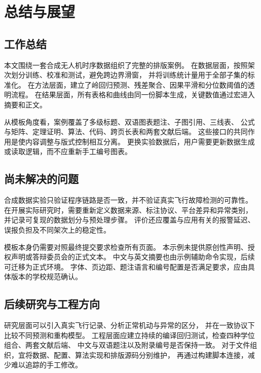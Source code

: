 \chapter{总结与展望}\label{chap:conclusions}
\section{工作总结}
本文围绕一套合成无人机时序数据组织了完整的排版案例。
在数据层面，按照架次划分训练、校准和测试，避免跨边界滑窗，
并将训练统计量用于全部子集的标准化。
在方法层面，建立了岭回归预测、残差聚合、因果平滑和分位数阈值的透明流程。
在结果层面，所有表格和曲线由同一份脚本生成，关键数值通过宏进入摘要和正文。

从模板角度看，案例覆盖了多级标题、双语图表题注、子图引用、三线表、
公式与矩阵、定理证明、算法、代码、跨页长表和两套文献后端。
这些接口的共同作用是使内容调整与版式控制相互分离。
更换实验数据后，用户需要更新数据生成或读取逻辑，而不应重新手工编号图表。

\section{尚未解决的问题}
合成数据实验只验证程序链路是否一致，并不验证真实飞行故障检测的可靠性。
在开展实际研究时，需要重新定义数据来源、标注协议、平台差异和异常类别，
并记录可复现的数据划分与预处理步骤。
评价还应覆盖与应用有关的报警延迟、误报负担及不同架次上的稳定性。

模板本身仍需要对照最终提交要求检查所有页面。
本示例未提供原创性声明、授权声明或答辩委员会的正式文本。
中文与英文摘要也由示例辅助命令实现，后续可迁移为正式环境。
字体、页边距、题注语言和编号配置是否满足要求，应由具体版本的学校规范确认。

\section{后续研究与工程方向}
研究层面可以引入真实飞行记录、分析正常机动与异常的区分，
并在一致协议下比较不同预测和重构模型。
工程层面应建立持续的编译回归测试，检查四种学位组合、两套文献后端、
中文与双语题注以及附录编号是否保持一致。
对于文件组织，宜将数据、配置、算法实现和排版源码分别维护，
再通过构建脚本连接，减少难以追踪的手工修改。
